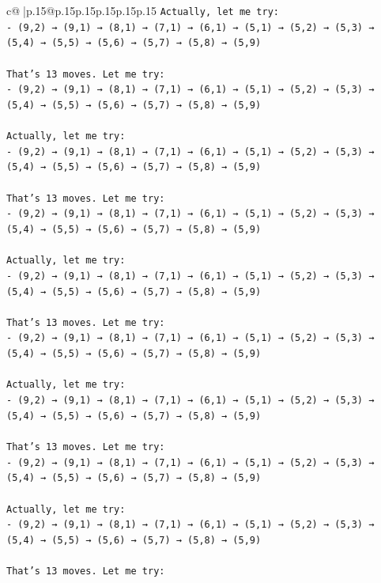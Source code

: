 \documentclass{article}
\begin{document}
{\begin{supertabular}{c@{$\;$}|p{.15\linewidth}@{}p{.15\linewidth}p{.15\linewidth}p{.15\linewidth}p{.15\linewidth}p{.15\linewidth}}
{{{\texttt{Actually, let me try:} \\
\texttt{{-} (9,2) → (9,1) → (8,1) → (7,1) → (6,1) → (5,1) → (5,2) → (5,3) → (5,4) → (5,5) → (5,6) → (5,7) → (5,8) → (5,9)} \\
\\ 
\texttt{That's 13 moves. Let me try:} \\
\texttt{{-} (9,2) → (9,1) → (8,1) → (7,1) → (6,1) → (5,1) → (5,2) → (5,3) → (5,4) → (5,5) → (5,6) → (5,7) → (5,8) → (5,9)} \\
\\ 
\texttt{Actually, let me try:} \\
\texttt{{-} (9,2) → (9,1) → (8,1) → (7,1) → (6,1) → (5,1) → (5,2) → (5,3) → (5,4) → (5,5) → (5,6) → (5,7) → (5,8) → (5,9)} \\
\\ 
\texttt{That's 13 moves. Let me try:} \\
\texttt{{-} (9,2) → (9,1) → (8,1) → (7,1) → (6,1) → (5,1) → (5,2) → (5,3) → (5,4) → (5,5) → (5,6) → (5,7) → (5,8) → (5,9)} \\
\\ 
\texttt{Actually, let me try:} \\
\texttt{{-} (9,2) → (9,1) → (8,1) → (7,1) → (6,1) → (5,1) → (5,2) → (5,3) → (5,4) → (5,5) → (5,6) → (5,7) → (5,8) → (5,9)} \\
\\ 
\texttt{That's 13 moves. Let me try:} \\
\texttt{{-} (9,2) → (9,1) → (8,1) → (7,1) → (6,1) → (5,1) → (5,2) → (5,3) → (5,4) → (5,5) → (5,6) → (5,7) → (5,8) → (5,9)} \\
\\ 
\texttt{Actually, let me try:} \\
\texttt{{-} (9,2) → (9,1) → (8,1) → (7,1) → (6,1) → (5,1) → (5,2) → (5,3) → (5,4) → (5,5) → (5,6) → (5,7) → (5,8) → (5,9)} \\
\\ 
\texttt{That's 13 moves. Let me try:} \\
\texttt{{-} (9,2) → (9,1) → (8,1) → (7,1) → (6,1) → (5,1) → (5,2) → (5,3) → (5,4) → (5,5) → (5,6) → (5,7) → (5,8) → (5,9)} \\
\\ 
\texttt{Actually, let me try:} \\
\texttt{{-} (9,2) → (9,1) → (8,1) → (7,1) → (6,1) → (5,1) → (5,2) → (5,3) → (5,4) → (5,5) → (5,6) → (5,7) → (5,8) → (5,9)} \\
\\ 
\texttt{That's 13 moves. Let me try:} \\
}}}
\end{supertabular}}
\end{document}
